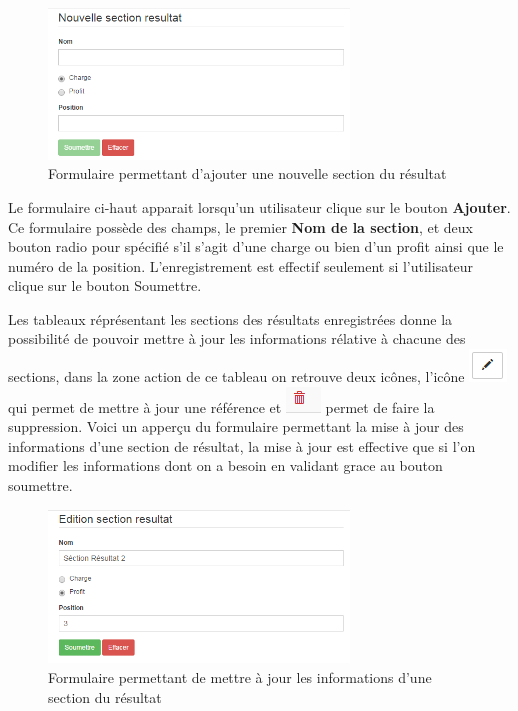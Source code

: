 \documentclass[12pt,a4paper]{report}
\begin{document}
\begin{figure}[h]
\begin{center}
\includegraphics[width=8cm]{pic/NewSectionResultat.png}
\end{center}
\caption{Formulaire permettant d'ajouter une nouvelle section du résultat}
\label{Formulaire permettant d'ajouter une nouvelle section du résultat}
\end{figure}

Le formulaire ci-haut apparait lorsqu'un utilisateur clique sur le bouton \textbf{Ajouter}. Ce formulaire possède des champs, le premier \textbf{Nom de la section}, et deux bouton radio pour spécifié s'il s'agit d'une charge ou bien d'un profit ainsi que le numéro de la position.
L'enregistrement est effectif seulement si l'utilisateur clique sur le bouton Soumettre.

\newpage
Les tableaux réprésentant les sections des résultats enregistrées donne la possibilité de pouvoir mettre à jour les informations rélative à chacune des sections, dans la zone action de ce tableau on retrouve deux icônes, l'icône \includegraphics[scale=0.7]{pic/EditBlack.png} qui permet de mettre à jour une référence et \includegraphics[scale=0.7]{pic/DeleteWRed.png} permet de faire la suppression.
Voici un apperçu du formulaire permettant la mise à jour des informations d'une section de résultat, la mise à jour est effective que si l'on modifier les informations dont on a besoin en validant grace au bouton soumettre. 

\begin{figure}[h]
\begin{center}
\includegraphics[width=8cm]{pic/EditSectionResultat.png}
\end{center}
\caption{Formulaire permettant de mettre à jour les informations d'une section du résultat}
\label{Formulaire permettant de mettre à jour les informations d'une section du résultat}
\end{figure} 
\end{document}
